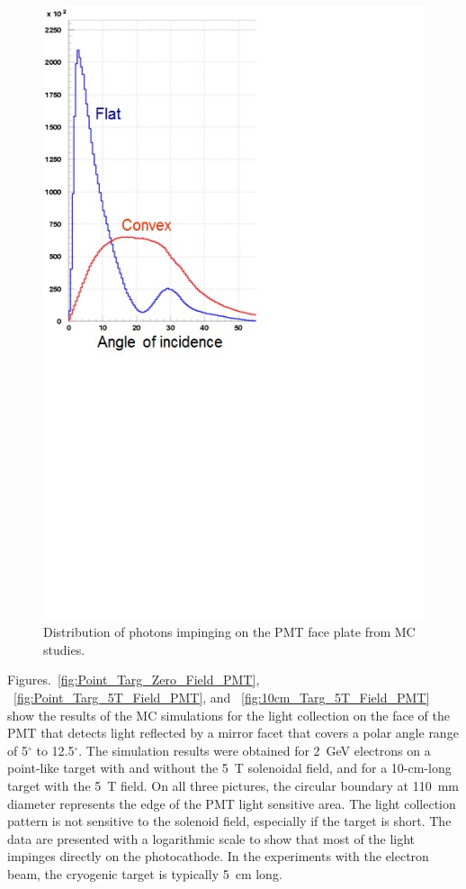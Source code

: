\begin{figure}[!ht]
    \centering
    \includegraphics[width=1.0\linewidth,trim={0.0cm 9.1cm 6.3cm 0.1cm},clip]{images/Flat_Convex.jpg}
    \caption{Distribution of photons impinging on the PMT face plate from MC studies.}
    \label{fig:Flat_Convex}
\end{figure}

Figures.~\ref{fig:Point_Targ_Zero_Field_PMT}, ~\ref{fig:Point_Targ_5T_Field_PMT}, and
~\ref{fig:10cm_Targ_5T_Field_PMT} show the results of the MC simulations for the light collection on the face
of the PMT that detects light reflected by a mirror facet that covers a polar angle range of 5$^\circ$ to 12.5$^\circ$.
The simulation results were obtained for 2~GeV electrons on a point-like target with and without the 5~T solenoidal
field, and for a 10-cm-long target with the 5~T field. On all three pictures, the circular boundary at 110~mm diameter
represents the edge of the PMT light sensitive area. The light collection pattern is not sensitive to the solenoid field,
especially if the target is short. The data are presented with a logarithmic scale to show that most of the light
impinges directly on the photocathode. In the experiments with the electron beam, the cryogenic target is
typically 5~cm long. 

